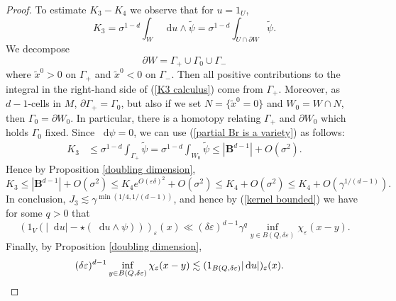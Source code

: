 \documentclass[reqno,10pt]{amsart}
\newcommand{\Ball}{\mathbf{B}}
\newcommand*\dif{\mathop{}\!\mathrm{d}}
\theoremstyle{definition}
\numberwithin{equation}{section}
\begin{document}
\begin{proof}
To estimate $K_3 - K_4$ we observe that for $u = 1_U$,
\begin{equation}\label{K3 calculus}
K_3 = \sigma^{1 - d} \int_W \dif u \wedge \tilde \psi = \sigma^{1 - d} \int_{U \cap \partial W} \tilde \psi.
\end{equation}
We decompose
$$\partial W = \Gamma_+ \cup \Gamma_0 \cup \Gamma_-$$
where $\tilde x^0 > 0$ on $\Gamma_+$ and $\tilde x^0 < 0$ on $\Gamma_-$. Then all positive contributions to the integral in the right-hand side of (\ref{K3 calculus}) come from $\Gamma_+$.
Moreover, as $d-1$-cells in $M$, $\partial \Gamma_+ = \Gamma_0$, but also if we set $N = \{\tilde x^0 = 0\}$ and $W_0 = W \cap N$, then $\Gamma_0 = \partial W_0$.
In particular, there is a homotopy relating $\Gamma_+$ and $\partial W_0$ which holds $\Gamma_0$ fixed.
Since $\dif \psi = 0$, we can use (\ref{partial Br is a variety}) as follows:
\begin{align*}
K_3 &\leq \sigma^{1 - d} \int_{\Gamma_+} \tilde \psi = \sigma^{1 - d} \int_{W_0} \tilde \psi \leq |\Ball^{d - 1}| + O(\sigma^2).
\end{align*}
Hence by Proposition \ref{doubling dimension},
$$K_3 \leq |\Ball^{d - 1}| + O(\sigma^2) \leq K_4 e^{O(\varepsilon\delta)^2} + O(\sigma^2) \leq K_4 + O(\sigma^2) \leq K_4 + O(\gamma^{1/(d - 1)}).$$
In conclusion, $J_3 \lesssim \gamma^{\min(1/4, 1/(d - 1))}$, and hence by (\ref{kernel bounded}) we have for some $q > 0$ that
$$(1_V(|\dif u| - \star(\dif u \wedge \psi)))_\varepsilon(x) \ll (\delta\varepsilon)^{d - 1} \gamma^q \inf_{y \in B(Q, \delta\varepsilon)} \chi_\varepsilon(x - y).$$
Finally, by Proposition \ref{doubling dimension},
\begin{align*}
(\delta\varepsilon)^{d - 1} \inf_{y \in B(Q, \delta\varepsilon)} \chi_\varepsilon(x - y) &\lesssim (1_{B(Q, \delta\varepsilon)} |\dif u|)_\varepsilon(x). \qedhere
\end{align*}
\end{proof}
\end{document}
